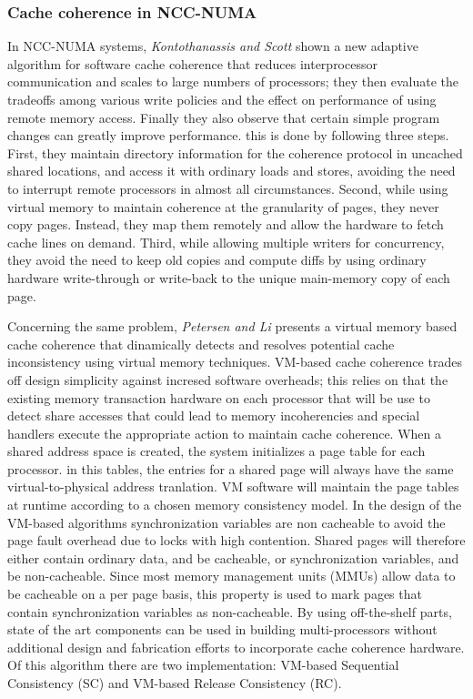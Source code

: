 \documentclass[a4paper,10pt]{article}
\begin{document}
\begin{multicols}{2}
\subsubsection{Cache coherence in NCC-NUMA}
In NCC-NUMA systems, \emph{Kontothanassis and Scott} \cite{Kontothanassis94softwarecache} shown a new adaptive algorithm for software cache coherence that reduces interprocessor communication and scales to large numbers of processors; they then evaluate the tradeoffs among various write policies and the effect on performance of using remote memory access. Finally they also observe that certain simple program changes can greatly improve performance. this is done by following three steps. First, they maintain directory information for the coherence protocol in uncached shared locations, and access it with ordinary loads and stores, avoiding the need to interrupt remote processors in almost all circumstances. Second, while using virtual memory to maintain coherence at the granularity of pages, they never copy pages. Instead, they map them remotely and allow the hardware to fetch cache lines on demand. Third, while allowing multiple writers for concurrency, they avoid the need to keep old copies and compute diffs by using ordinary hardware write-through or write-back to the unique main-memory copy of each page. \par 
\parindent 10mm Concerning the same problem, \emph{Petersen and Li} \cite{Li95multiprocessorcache} presents a virtual memory based cache coherence that dinamically detects and resolves potential cache inconsistency using virtual memory techniques. VM-based cache coherence trades off design simplicity against incresed software overheads; this relies on that the existing memory transaction hardware on each processor that will be use to detect share accesses that could lead to memory incoherencies and special handlers execute the appropriate action to maintain cache coherence.
When a shared address space is created, the system initializes a page table for each processor. in this tables, the entries for a shared page will always have the same virtual-to-physical address tranlation. VM software will maintain the page tables at runtime according to a chosen memory consistency model. In the design of the VM-based algorithms synchronization variables are non cacheable to avoid the page fault overhead due to locks with high contention. Shared pages will therefore either contain ordinary data, and be cacheable, or synchronization variables, and be non-cacheable. Since most memory management units (MMUs) allow data to be cacheable on a per page basis, this property is used to mark pages that contain synchronization variables as non-cacheable.
By using off-the-shelf parts, state of the art components can be used in building multi-processors without additional design and fabrication efforts to incorporate cache coherence hardware.\\
Of this algorithm there are two implementation: VM-based Sequential Consistency (SC) and VM-based Release Consistency (RC).


\end{multicols}
\end{document}
